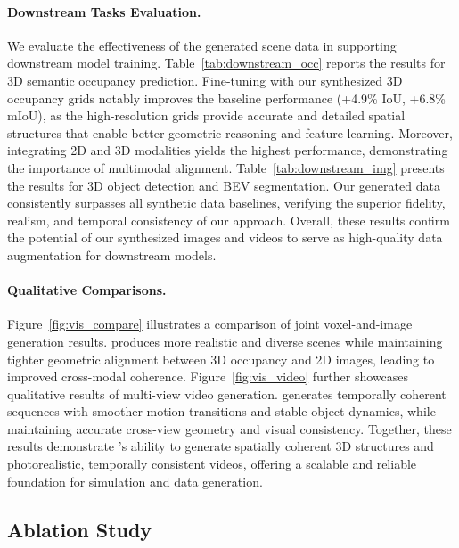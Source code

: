 \paragraph{Downstream Tasks Evaluation.}
We evaluate the effectiveness of the generated scene data in supporting downstream model training.
Table~\ref{tab:downstream_occ} reports the results for 3D semantic occupancy prediction. Fine-tuning with our synthesized 3D occupancy grids notably improves the baseline performance (+4.9\% IoU, +6.8\% mIoU), as the high-resolution grids provide accurate and detailed spatial structures that enable better geometric reasoning and feature learning.
Moreover, integrating 2D and 3D modalities yields the highest performance, demonstrating the importance of multimodal alignment.
Table~\ref{tab:downstream_img} presents the results for 3D object detection and BEV segmentation. Our generated data consistently surpasses all synthetic data baselines, verifying the superior fidelity, realism, and temporal consistency of our approach.
Overall, these results confirm the potential of our synthesized images and videos to serve as high-quality data augmentation for downstream models.

\paragraph{Qualitative Comparisons.}
Figure~\ref{fig:vis_compare} illustrates a comparison of joint voxel-and-image generation results. {\method} produces more realistic and diverse scenes while maintaining tighter geometric alignment between 3D occupancy and 2D images, leading to improved cross-modal coherence.
Figure~\ref{fig:vis_video} further showcases qualitative results of multi-view video generation. {\method} generates temporally coherent sequences with smoother motion transitions and stable object dynamics, while maintaining accurate cross-view geometry and visual consistency.
Together, these results demonstrate {\method}’s ability to generate spatially coherent 3D structures and photorealistic, temporally consistent videos, offering a scalable and reliable foundation for simulation and data generation.

\subsection{Ablation Study}
